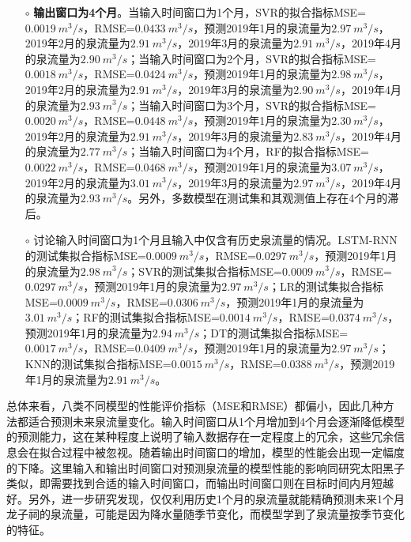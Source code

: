 \begin{enumerate}
\begin{itemize}
    \item[$\circ$] \textbf{输出窗口为4个月}。当输入时间窗口为1个月，SVR的拟合指标MSE=\\$\SI{0.0019}{m^{3}/s}$，RMSE=$\SI{0.0433}{m^{3}/s}$，预测2019年1月的泉流量为$\SI{2.97}{m^{3}/s}$，2019年2月的泉流量为$\SI{2.91}{m^{3}/s}$，2019年3月的泉流量为$\SI{2.91}{m^{3}/s}$，2019年4月的泉流量为$\SI{2.90}{m^{3}/s}$；当输入时间窗口为2个月，SVR的拟合指标MSE=$\SI{0.0018}{m^{3}/s}$，RMSE=$\SI{0.0424}{m^{3}/s}$，预测2019年1月的泉流量为$\SI{2.98}{m^{3}/s}$，2019年2月的泉流量为$\SI{2.91}{m^{3}/s}$，2019年3月的泉流量为$\SI{2.90}{m^{3}/s}$，2019年4月的泉流量为$\SI{2.93}{m^{3}/s}$；当输入时间窗口为3个月，SVR的拟合指标MSE=$\SI{0.0020}{m^{3}/s}$，RMSE=$\SI{0.0448}{m^{3}/s}$，预测2019年1月的泉流量为$\SI{2.30}{m^{3}/s}$，2019年2月的泉流量为$\SI{2.91}{m^{3}/s}$，2019年3月的泉流量为$\SI{2.83}{m^{3}/s}$，2019年4月的泉流量为$\SI{2.77}{m^{3}/s}$；当输入时间窗口为4个月，RF的拟合指标MSE=$\SI{0.0022}{m^{3}/s}$，RMSE=$\SI{0.0468}{m^{3}/s}$，预测2019年1月的泉流量为$\SI{3.07}{m^{3}/s}$，2019年2月的泉流量为$\SI{3.01}{m^{3}/s}$，2019年3月的泉流量为$\SI{2.97}{m^{3}/s}$，2019年4月的泉流量为$\SI{2.93}{m^{3}/s}$。另外，多数模型在测试集和其观测值上存在4个月的滞后。
    \item[$\circ$] 讨论输入时间窗口为1个月且输入中仅含有历史泉流量的情况。LSTM-RNN的测试集拟合指标MSE=$\SI{0.0009}{m^{3}/s}$，RMSE=$\SI{0.0297}{m^{3}/s}$，预测2019年1月的泉流量为$\SI{2.98}{m^{3}/s}$；SVR的测试集拟合指标MSE=$\SI{0.0009}{m^{3}/s}$，RMSE=\\$\SI{0.0297}{m^{3}/s}$，预测2019年1月的泉流量为$\SI{2.97}{m^{3}/s}$；LR的测试集拟合指标MSE=$\SI{0.0009}{m^{3}/s}$，RMSE=$\SI{0.0306}{m^{3}/s}$，预测2019年1月的泉流量为$\SI{3.01}{m^{3}/s}$；RF的测试集拟合指标MSE=$\SI{0.0014}{m^{3}/s}$，RMSE=$\SI{0.0374}{m^{3}/s}$，预测2019年1月的泉流量为$\SI{2.94}{m^{3}/s}$；DT的测试集拟合指标MSE=$\SI{0.0017}{m^{3}/s}$，RMSE=$\SI{0.0409}{m^{3}/s}$，预测2019年1月的泉流量为$\SI{2.97}{m^{3}/s}$；KNN的测试集拟合指标MSE=$\SI{0.0015}{m^{3}/s}$，RMSE=$\SI{0.0388}{m^{3}/s}$，预测2019年1月的泉流量为$\SI{2.91}{m^{3}/s}$。 
  \end{itemize}
    
  总体来看，八类不同模型的性能评价指标（MSE和RMSE）都偏小，因此几种方法都适合预测未来泉流量变化。输入时间窗口从1个月增加到4个月会逐渐降低模型的预测能力，这在某种程度上说明了输入数据存在一定程度上的冗余，这些冗余信息会在拟合过程中被忽视。随着输出时间窗口的增加，模型的性能会出现一定幅度的下降。这里输入和输出时间窗口对预测泉流量的模型性能的影响同研究太阳黑子类似，即需要找到合适的输入时间窗口，而输出时间窗口则在目标时间内月短越好。另外，进一步研究发现，仅仅利用历史1个月的泉流量就能精确预测未来1个月龙子祠的泉流量，可能是因为降水量随季节变化，而模型学到了泉流量按季节变化的特征。


\end{enumerate}
